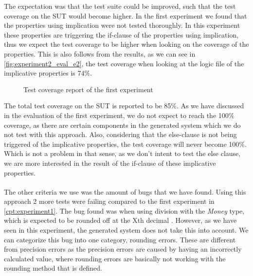 The expectation was that the test suite could be improved, such that the test coverage on the SUT would become higher. In the first experiment we found that the properties using implication were not tested thoroughly. In this experiment these properties are triggering the if-clause of the properties using implication, thus we expect the test coverage to be higher when looking on the coverage of the properties. This is also follows from the results, as we can see in \autoref{fig:experiment2_eval_e2}, the test coverage when looking at the logic file of the implicative properties is 74\%.
\FloatBarrier
\begin{figure}[!ht]
\caption{Test coverage report of the first experiment}
\label{fig:experiment2_eval_e2}
\centering
\end{figure}
\FloatBarrier
The total test coverage on the SUT is reported to be 85\%. As we have discussed in the evaluation of the first experiment, we do not expect to reach the 100\% coverage, as there are certain components in the generated system which we do not test with this approach. Also, considering that the else-clause is not being triggered of the implicative properties, the test coverage will never become 100\%. Which is not a problem in that sense, as we don't intent to test the else clause, we are more interested in the result of the if-clause of these implicative properties.\\
\\
The other criteria we use was the amount of bugs that we have found. Using this approach 2 more tests were failing compared to the first experiment in \autoref{cpt:experiment1}. The bug found was when using division with the \textit{Money} type, which is expected to be rounded off at the Xth decimal . However, as we have seen in this experiment, the generated system does not take this into account. We can categorize this bug into one category, rounding errors. These are different from precision errors as the precision errors are caused by having an incorrectly calculated value, where rounding errors are basically not working with the rounding method that is defined.

